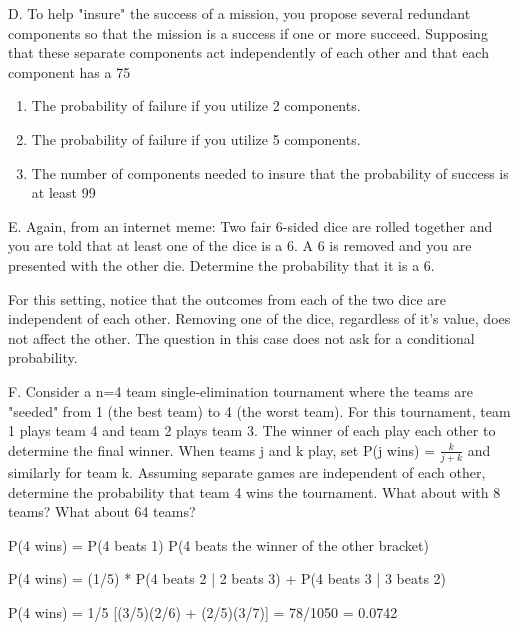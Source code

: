 \documentclass[10pt,]{book}
\theoremstyle{plain}
\theoremstyle{definition}
\theoremstyle{definition}
\theoremstyle{definition}
\numberwithin{equation}{section}
\begin{document}
\par

	D.  To help "insure" the success of a mission, you propose several redundant components so that the mission is a success if one or more succeed. Supposing that these separate components act independently of each other and that each component has a 75%
	\leavevmode%
\begin{enumerate}
\item\hypertarget{li-152}{}The probability of failure if you utilize 2 components.%
\item\hypertarget{li-153}{}The probability of failure if you utilize 5 components.%
\item\hypertarget{li-154}{}The number of components needed to insure that the probability of success is at least 99%
\end{enumerate}

\par

	E.  Again, from an internet meme:  Two fair 6-sided dice are rolled together and you are told that at least one of the dice is a 6. A 6 is removed and you are presented with the other die.  Determine the probability that it is a 6.

	For this setting, notice that the outcomes from each of the two dice are independent of each other. Removing one of the dice, regardless of it's value, does not affect the other. The question in this case does not ask for a conditional probability.
\par

	F.  Consider a n=4 team single-elimination tournament where the teams are "seeded" from 1 (the best team) to 4 (the worst team).  For this tournament, team 1 plays team 4 and team 2 plays team 3. The winner of each play each other to determine the final winner. When teams j and k play, set P(j wins) = \(\frac{k}{j+k}\) and similarly for team k.  Assuming separate games are independent of each other, determine the probability that team 4 wins the tournament. What about with 8 teams? What about 64 teams?

	P(4 wins) = P(4 beats 1) P(4 beats the winner of the other bracket)
\par

	P(4 wins) = (1/5) * P(4 beats 2 | 2 beats 3) + P(4 beats 3 | 3 beats 2)
\par

	P(4 wins) = 1/5 [(3/5)(2/6) + (2/5)(3/7)] = 78/1050 = 0.0742
\par
\end{document}
